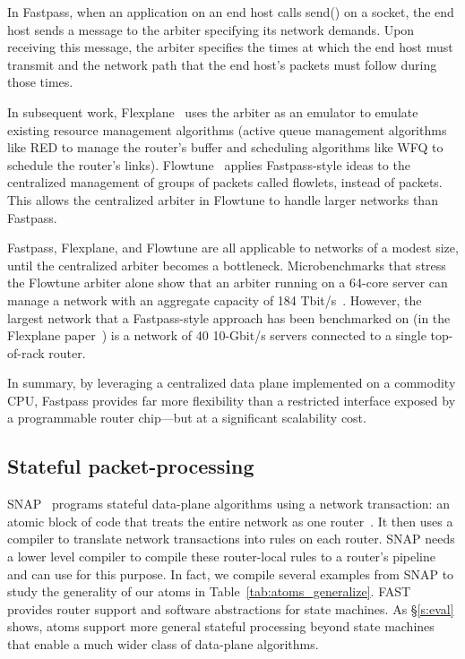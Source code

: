 In Fastpass, when an application on an end host calls send() on a socket, the
end host sends a message to the arbiter specifying its network demands. Upon
receiving this message, the arbiter specifies the times at which the end host
must transmit and the network path that the end host's packets must follow
during those times. 

In subsequent work, Flexplane~\cite{flexplane} uses the arbiter as an emulator
to emulate existing resource management algorithms (\eg active queue management
algorithms like RED to manage the router's buffer and scheduling algorithms
like WFQ to schedule the router's links).  Flowtune~\cite{flowtune} applies
Fastpass-style ideas to the centralized management of groups of packets called
flowlets, instead of packets.  This allows the centralized arbiter in Flowtune
to handle larger networks than Fastpass.

Fastpass, Flexplane, and Flowtune are all applicable to networks of a modest
size, until the centralized arbiter becomes a bottleneck.  Microbenchmarks that
stress the Flowtune arbiter alone show that an arbiter running on a 64-core
server can manage a network with an aggregate capacity of 184
Tbit/s~\cite{flowtune}. However, the largest network that a Fastpass-style
approach has been benchmarked on (in the Flexplane paper~\cite{flexplane}) is a
network of 40 10-Gbit/s servers connected to a single top-of-rack router.

In summary, by leveraging a centralized data plane implemented on a commodity
CPU, Fastpass provides far more flexibility than a restricted interface exposed
by a programmable router chip---but at a significant scalability cost.

\subsection{Stateful packet-processing}
SNAP~\cite{snap} programs stateful data-plane algorithms using a network
transaction: an atomic block of code that treats the entire network as one
router~\cite{onebigswitch}. It then uses a compiler to translate network
transactions into rules on each router. SNAP needs a lower level compiler to
compile these router-local rules to a router's pipeline and can use
\pktlanguage for this purpose. In fact, we compile several examples from SNAP
to study the generality of our atoms in Table~\ref{tab:atoms_generalize}.
FAST~\cite{fast} provides router support and software abstractions for state
machines. As \S\ref{s:eval} shows, atoms support more general stateful
processing beyond state machines that enable a much wider class of data-plane
algorithms.

